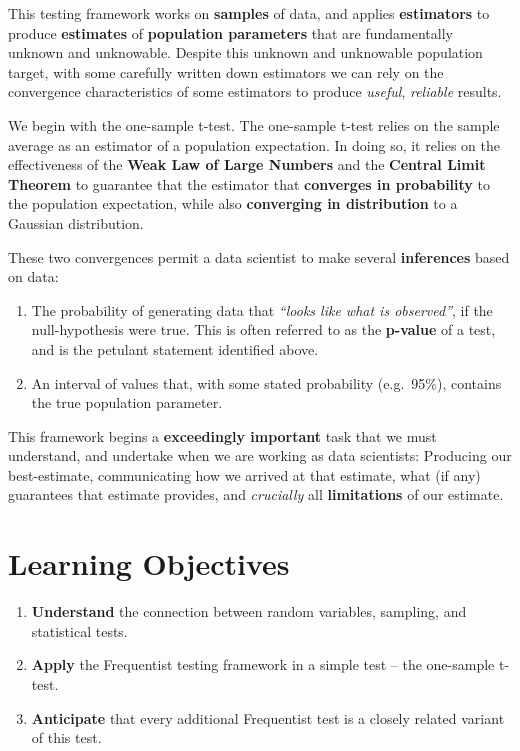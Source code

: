 \documentclass[
]{book}
\providecommand{\tightlist}{%
  \setlength{\itemsep}{0pt}\setlength{\parskip}{0pt}}
\theoremstyle{definition}
\theoremstyle{definition}
\theoremstyle{definition}
\theoremstyle{definition}
\theoremstyle{remark}
\begin{document}
This testing framework works on \textbf{samples} of data, and applies \textbf{estimators} to produce \textbf{estimates} of \textbf{population parameters} that are fundamentally unknown and unknowable. Despite this unknown and unknowable population target, with some carefully written down estimators we can rely on the convergence characteristics of some estimators to produce \emph{useful}, \emph{reliable} results.

We begin with the one-sample t-test. The one-sample t-test relies on the sample average as an estimator of a population expectation. In doing so, it relies on the effectiveness of the \textbf{Weak Law of Large Numbers} and the \textbf{Central Limit Theorem} to guarantee that the estimator that \textbf{converges in probability} to the population expectation, while also \textbf{converging in distribution} to a Gaussian distribution.

These two convergences permit a data scientist to make several \textbf{inferences} based on data:

\begin{enumerate}
\def\labelenumi{\arabic{enumi}.}
\tightlist
\item
  The probability of generating data that \emph{``looks like what is observed''}, if the null-hypothesis were true. This is often referred to as the \textbf{p-value} of a test, and is the petulant statement identified above.
\item
  An interval of values that, with some stated probability (e.g.~95\%), contains the true population parameter.
\end{enumerate}

This framework begins a \textbf{exceedingly important} task that we must understand, and undertake when we are working as data scientists: Producing our best-estimate, communicating how we arrived at that estimate, what (if any) guarantees that estimate provides, and \emph{crucially} all \textbf{limitations} of our estimate.

\hypertarget{learning-objectives-5}{%
\section{Learning Objectives}\label{learning-objectives-5}}

\begin{enumerate}
\def\labelenumi{\arabic{enumi}.}
\tightlist
\item
  \textbf{Understand} the connection between random variables, sampling, and statistical tests.
\item
  \textbf{Apply} the Frequentist testing framework in a simple test -- the one-sample t-test.
\item
  \textbf{Anticipate} that every additional Frequentist test is a closely related variant of this test.
\end{enumerate}
\end{document}
